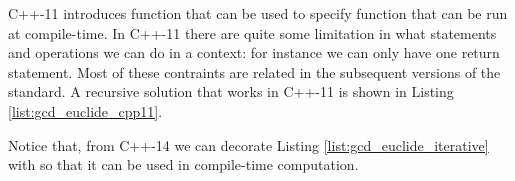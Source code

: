 C++-11 introduces  function that can be used to specify function that can be run at compile-time. In C++-11 there are quite some limitation in what statements and operations we can do in a  context: for instance we can only have one return statement. Most of these contraints are related in the subsequent versions of the standard. A  recursive solution that works in C++-11 is shown in Listing \ref{list:gcd_euclide_cpp11}.



Notice that, from C++-14 we can decorate Listing \ref{list:gcd_euclide_iterative} with  so that it can be used in compile-time computation.




